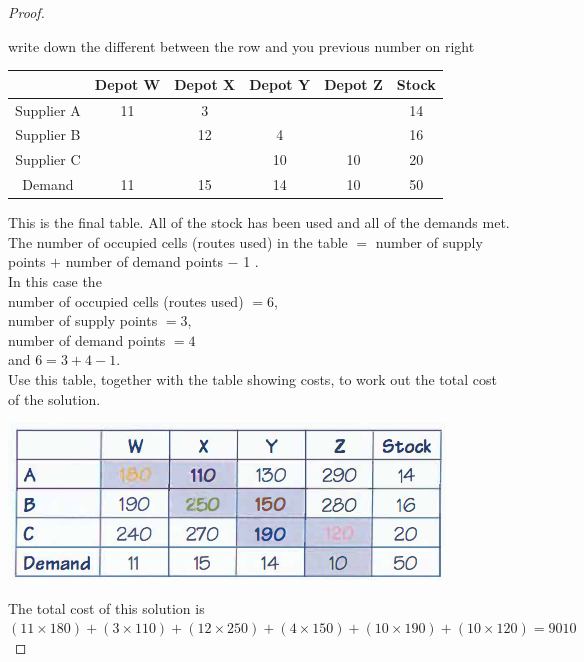 \documentclass[a4paper]{article}
\begin{document}
\begin{eg}
\begin{proof}
\begin{center}
		\end{center}
		write down the different between the row and you previous number on right
		\begin{center}
			\begin{tabular}{|c|c|c|c|c|c|}
				\hline
				           & Depot W & Depot X & Depot Y & Depot Z & Stock \\
				\hline
				Supplier A & 11      & 3       &         &         & 14    \\
				\hline
				Supplier B &         & 12      & 4       &         & 16    \\
				\hline
				Supplier C &         &         & 10      & 10      & 20    \\
				\hline
				Demand     & 11      & 15      & 14      & 10      & 50    \\
				\hline
			\end{tabular}
		\end{center}
		This is the final table. All of the stock has been used and all of the demands met.\\

		The number of occupied cells (routes used) in the table $=$ number of supply points $+$ number of demand points $-$ 1 .\\
		In this case the \\
		number of occupied cells (routes used) $= 6$, \\
		number of supply points $= 3$,\\
		number of demand points $= 4$ \\
		and $6 = 3 + 4 - 1$.\\

		Use this table, together with the table showing costs, to work out the total cost of the solution.
		\begin{center}
			\includegraphics[scale=0.5]{img_D/8_2}
		\end{center}

		The total cost of this solution is $(11\times 180)+(3\times 110)+(12\times 250)+(4\times 150)+(10\times 190)+(10\times 120)=9010$
	\end{proof}
\end{eg}
\end{document}
